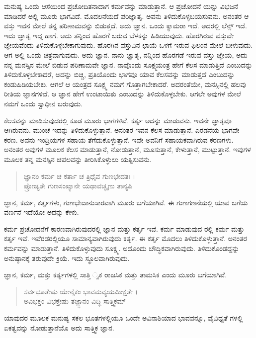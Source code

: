 ಮನುಷ್ಯ ಒಂದು ಆಸೆಯಿಂದ ಪ್ರಚೋದಿತನಾದಾಗ ಕರ್ಮವನ್ನು ಮಾಡುತ್ತಾನೆ. ಆ ಪ್ರಚೋದನೆ ಯನ್ನು ವಿಭಜನೆ ಮಾಡಿದರೆ ಅಲ್ಲಿ ಮೂರು ಭಾಗವಿದೆ. ಮೊದಲನೆಯದೆ ಪರಿಜ್ಞಾತೃ. ಅವನು ತಿಳಿದುಕೊಳ್ಳಬಯಸುವನು. ಅನಂತರ ಆ ವಸ್ತು ಇವನ ಮೇಲೆ ತನ್ನ ಪರಿಣಾಮವನ್ನು ಬಿಡುತ್ತದೆ. ಅದು ಜ್ಞಾನ. ಒಂದು ಕ್ಯಾಮರಾ ಇದೆ. ಅದರಲ್ಲಿ ಲೆನ್ಸ್ ಇದೆ. ಇದು ಜ್ಞಾತೃ ಇದ್ದ ಹಾಗೆ. ಅದು ತನ್ನಿಂದ ಹೊರಗೆ ಬರುವ ಬೆಳಕನ್ನು ಹಿಡಿಯುವುದು. ಹೊರಗಿರುವ ವಸ್ತುವೇ ಜ್ಞೇಯವೆಂದು ತಿಳಿದುಕೊಳ್ಳಬೇಕಾಗುವುದು. ಹೊರಗಿನ ವಸ್ತುವಿನ ಛಾಯೆ ಒಳಗೆ ಇರುವ ಫಿಲಂನ ಮೇಲೆ ಬೀಳುವುದು. ಆಗ ಅಲ್ಲಿ ಒಂದು ಚಿತ್ರವಾಗುವುದು. ಅದು ಜ್ಞಾನ. ನಾನು ಜ್ಞಾತೃ, ನನ್ನಿಂದ ಹೊರಗಡೆ ಇರುವ ವಸ್ತು ಜ್ಞೇಯ, ಅದು ನನ್ನ ಮನಸ್ಸಿನ ಮೇಲೆ ಬಿಡುವ ಪರಿಣಾಮವೇ ಜ್ಞಾನ. ನಾವೊಂದು ಸೂಕ್ಷ್ಮಯಂತ್ರ ಹೇಗೆ ಕೆಲಸ ಮಾಡುತ್ತಿದೆ ಎಂಬುದನ್ನು ತಿಳಿದುಕೊಳ್ಳಬೇಕಾದರೆ, ಅದನ್ನು ಬಿಚ್ಚಿ, ಪ್ರತಿಯೊಂದು ಭಾಗವೂ ಯಾವ ಕೆಲಸವನ್ನು ಮಾಡುತ್ತದೆ ಎಂಬುದನ್ನು ಕಂಡುಹಿಡಿಯಬೇಕು. ಆಗಲೆ ಆ ಯಂತ್ರದ ಸೂಕ್ಷ್ಮ ನಮಗೆ ಗೊತ್ತಾಗಬೇಕಾದರೆ. ಅದರಂತೆಯೇ, ಮನಸ್ಸಿನಲ್ಲಿ ಹಲವು ರೀತಿಯ ಜ್ಞಾನಗಳಿವೆ. ಆ ಜ್ಞಾನ ಹೇಗೆ ಉಂಟಾಯಿತು ಎಂಬುದನ್ನು ತಿಳಿದುಕೊಳ್ಳಬೇಕು. ಆಗಲೇ ಅವುಗಳ ಮೇಲೆ ನಮಗೆ ಒಂದು ಸ್ವಾಧೀನ ಬರುವುದು.

ಕೆಲಸವನ್ನು ಮಾಡಿಸುವುದರಲ್ಲಿ ಕೂಡ ಮೂರು ಭಾಗಗಳಿವೆ. ಕರ್ತೃ ಅದನ್ನು ಮಾಡುವನು. ಇವನೇ ಜ್ಞಾತೃವೂ ಆಗಿರುವನು. ಮುಂಚೆ ಇದನ್ನು ತಿಳಿದುಕೊಳ್ಳುತ್ತಾನೆ. ಅನಂತರ ಇವನ ಕೆಲಸ ಮಾಡುತ್ತಾನೆ. ಎರಡನೆಯ ಭಾಗವೇ ಕರಣ. ಅವನು ಇಂದ್ರಿಯಗಳ ಸಹಾಯ ತೆಗೆದುಕೊಳ್ಳುತ್ತಾನೆ. ಇವೇ ಅವನಿಗೆ ಸಹಾಯಕವಾಗಿರುವ ಕರಣಗಳು. ಅನಂತರ ಅವುಗಳ ಮೂಲಕ ಕೆಲಸ ಮಾಡುತ್ತಾನೆ, ನೋಡುತ್ತಾನೆ, ಮೂಸುತ್ತಾನೆ, ಕೇಳುತ್ತಾನೆ, ಮುಟ್ಟುತ್ತಾನೆ. ಇವುಗಳ ಮೂಲಕ ತನ್ನ ಮನಸ್ಸಿನ ಚಪಲವನ್ನು ತೀರಿಸಿಕೊಳ್ಳುಲು ಯತ್ನಿಸುವನು.

\begin{verse}
ಜ್ಞಾನಂ ಕರ್ಮ ಚ ಕರ್ತಾ ಚ ತ್ರಿಧೈವ ಗುಣಭೇದತಃ ।\\ಪ್ರೋಚ್ಯತೇ ಗುಣಸಂಖ್ಯಾನೇ ಯಥಾವಚ್ಛೃಣು ತಾನ್ಯಪಿ 
\end{verse}

{\small ಜ್ಞಾನ, ಕರ್ಮ, ಕರ್ತೃಗಳು, ಗುಣಭೇದಾನುಸಾರವಾಗಿ ಮೂರು ಬಗೆಯಾಗಿವೆ. ಈ ಗುಣಗಣನೆಯಲ್ಲಿ ಯಾವ ಬಗೆಯ ವರ್ಣನೆ ಇದೆಯೋ ಅದನ್ನು ಕೇಳು.}

ಕರ್ಮ ಪ್ರಚೋದನೆಗೆ ಕಾರಣವಾಗಿರುವುದರಲ್ಲಿ ಜ್ಞಾನ ಮತ್ತು ಕರ್ತೃ ಇವೆ. ಕರ್ಮ ಮಾಡುವುದ ರಲ್ಲಿ ಕರ್ಮ ಮತ್ತು ಕರ್ತೃ ಇವೆ. ಇವೆರಡರಲ್ಲಿಯೂ ಸಾಮಾನ್ಯವಾಗಿರುವುದು ಕರ್ತೃ. ಈ ಕರ್ತೃ ಮೊದಲು ತಿಳಿದುಕೊಳ್ಳುತ್ತಾನೆ. ಅನಂತರ ಕರ್ಮವನ್ನು ಮಾಡುತ್ತಾನೆ. ತಿಳಿದುಕೊಳ್ಳುವುದು ಸೂಕ್ಷ್ಮ. ಅದೊಂದು ಬೌದ್ಧಿಕವಾಗಿರುವುದು. ತಿಳಿದುಕೊಂಡದ್ದನ್ನು ಅನುಷ್ಠಾನಕ್ಕೆ ತರುವುದೇ ಕ್ರಿಯೆ. ಇದು ಸ್ಥೂಲವಾಗಿರುವುದು.

ಜ್ಞಾನ, ಕರ್ಮ, ಮತ್ತು ಕರ್ತೃಗಳಲ್ಲಿ ಸಾತ್ತಿ ್ವಕ ರಾಜಸಿಕ ಮತ್ತು ತಾಮಸಿಕ ಎಂದು ಮೂರು ಬಗೆಯಾಗಿವೆ.

\begin{verse}
ಸರ್ವಭೂತೇಷು ಯೇನೈಕಂ ಭಾವಮವ್ಯಯಮೀಕ್ಷತೇ ।\\ಅವಿಭಕ್ತಂ ವಿಭಕ್ತೇಷು ತಜ್ಜ್ಞಾನಂ ವಿದ್ಧಿ ಸಾತ್ತ್ವಿಕಮ್ 
\end{verse}

{\small ಯಾವುದರ ಮೂಲಕ ಮನುಷ್ಯ ಸಕಲ ಭೂತಗಳಲ್ಲಿಯೂ ಒಂದೇ ಅವಿನಾಶಿಯಾದ ಭಾವವನ್ನೂ, ವೈವಿಧ್ಯತೆ ಗಳಲ್ಲಿ ಏಕತ್ವವನ್ನು ನೋಡುತ್ತಾನೆಯೊ ಅದು ಸಾತ್ತ್ವಿಕ ಜ್ಞಾನ.}

